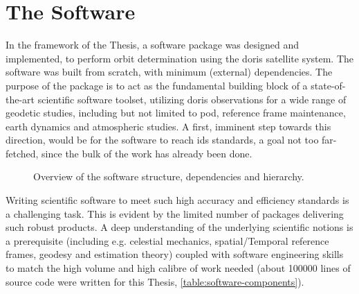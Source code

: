 \section{The Software}\label{sec:the-software}

In the framework of the Thesis, a software package was designed and implemented, to 
perform orbit determination using the \gls{doris} satellite system. The software 
was built from scratch, with minimum (external) dependencies. The purpose of the 
package is to act as the fundamental building block of a state-of-the-art scientific 
software toolset, utilizing \gls{doris} observations for a wide range of geodetic 
studies, including but not limited to \gls{pod}, reference frame maintenance, 
earth dynamics and atmospheric studies. A first, imminent step towards this direction, 
would be for the software to reach \gls{ids} standards, a goal not too far-fetched, 
since the bulk of the work has already been done.

\begin{figure}
  \centering
  
  \caption{Overview of the software structure, dependencies and hierarchy.}
  \label{fig:software-hierarchy}
\end{figure}

Writing scientific software to meet such high accuracy and efficiency standards 
is a challenging task. This is evident by the limited number of packages delivering 
such robust products. A deep understanding of the underlying scientific notions is 
a prerequisite (including e.g. celestial mechanics, spatial/Temporal reference frames, 
geodesy and estimation theory) coupled with software engineering skills to match the 
high volume and high calibre of work needed (about 100000 lines of source code were 
written for this Thesis, \autoref{table:software-components}).

